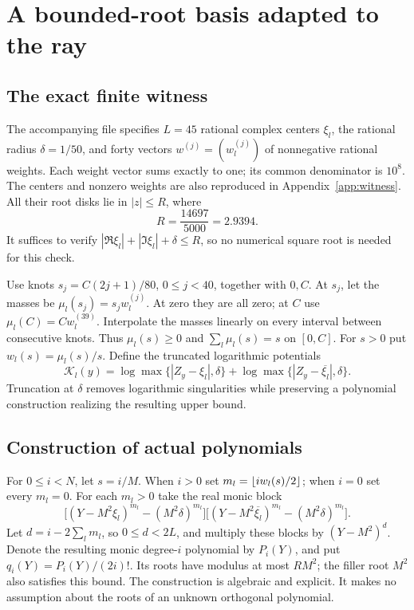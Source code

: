 \section{A bounded-root basis adapted to the ray}\label{sec:basis}
\subsection{The exact finite witness}
The accompanying file  specifies
$L=45$ rational complex centers $\xi_l$, the rational radius
$\delta=1/50$, and forty vectors $w^{(j)}=(w_l^{(j)})$ of
nonnegative rational weights.  Each weight vector sums exactly to one;
its common denominator is $10^8$.  The centers and nonzero weights are
also reproduced in Appendix~\ref{app:witness}.  All their root disks lie
in $|z|\le R$, where
\begin{equation}\label{eq:R}
 R=\frac{14697}{5000}=2.9394.
\end{equation}
It suffices to verify
$|\Re\xi_l|+|\Im\xi_l|+\delta\le R$, so no numerical square root
is needed for this check.

Use knots $s_j=C(2j+1)/80$, $0\le j<40$, together with $0,C$.
At $s_j$, let the masses be $\mu_l(s_j)=s_jw_l^{(j)}$.
At zero they are all zero; at $C$ use $\mu_l(C)=Cw_l^{(39)}$.
Interpolate the masses linearly on every interval between consecutive
knots.  Thus $\mu_l(s)\ge0$ and $\sum_l\mu_l(s)=s$ on $[0,C]$.
For $s>0$ put $w_l(s)=\mu_l(s)/s$.
Define the truncated logarithmic potentials
\begin{equation}\label{eq:Kpot}
 \mathcal K_l(y)=\log\max\{|Z_y-\xi_l|,\delta\}
            +\log\max\{|Z_y-\overline{\xi_l}|,\delta\}.
\end{equation}
Truncation at $\delta$ removes logarithmic singularities while preserving
a polynomial construction realizing the resulting upper bound.

\subsection{Construction of actual polynomials}
For $0\le i<N$, let $s=i/M$.  When $i>0$ set
$m_l=\left\lfloor iw_l(s)/2\right\rfloor$; when $i=0$ set every $m_l=0$.
For each $m_l>0$ take the real monic block
\begin{equation}\label{eq:block}
 \bigl[(Y-M^2\xi_l)^{m_l}-(M^2\delta)^{m_l}\bigr]
 \bigl[(Y-M^2\overline{\xi_l})^{m_l}-(M^2\delta)^{m_l}\bigr].
\end{equation}
Let $d=i-2\sum_lm_l$, so $0\le d<2L$, and multiply these blocks
by $(Y-M^2)^d$.  Denote the resulting monic degree-$i$ polynomial
by $P_i(Y)$, and put $q_i(Y)=P_i(Y)/(2i)!$.
Its roots have modulus at most $RM^2$; the filler root $M^2$ also
satisfies this bound.  The construction is algebraic and explicit.
It makes no assumption about the roots of an unknown orthogonal polynomial.

